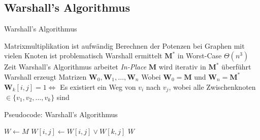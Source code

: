 \documentclass[mathserif]{beamer}
\begin{document}
\subsection{Warshall's Algorithmus}
\begin{frame}{Warshall's Algorithmus}
    \begin{outline}
        \pause
        \1 Matrixmultiplikation ist aufwändig
        \2 Berechnen der Potenzen bei Graphen mit vielen Knoten ist problematisch\pause
        \1 Warshall ermittelt $\mathbf{M}^*$ in Worst-Case $\Theta(n^3)$ Zeit
        \1 Warshall's Algorithmus arbeitet \textit{In-Place}
        \2 $\mathbf{M}$ wird iterativ in $\mathbf{M}^*$ überführt\pause
        \1 Warshall erzeugt Matrizen $\mathbf{W}_0,\mathbf{W}_1,\dots,\mathbf{W}_n$
        \2 Wobei $\mathbf{W}_0=\mathbf{M}$ und $\mathbf{W}_n=\mathbf{M}^*$
        \1 $\mathbf{W}_k[i,j]=1\Longleftrightarrow$ Es existiert ein Weg von $v_i$ nach $v_j$, wobei alle Zwischenknoten $\in\{v_1,v_2,\dots,v_k\}$ sind
    \end{outline}
\end{frame}
\begin{frame}{Pseudocode: Warshall's Algorithmus}
    \begin{algorithm}[H]
        \caption{Warshall's Algorithmus}
        \begin{algorithmic}[1]
                \State $W\gets M$
                                \State $W[i,j]\gets W[i,j]\lor W[k,j]$
                            \EndFor
                        \EndIf
                    \EndFor
                \EndFor
                \State \Return $W$
            \EndFunction
        \end{algorithmic}
    \end{algorithm}
\end{frame}
\end{document}
